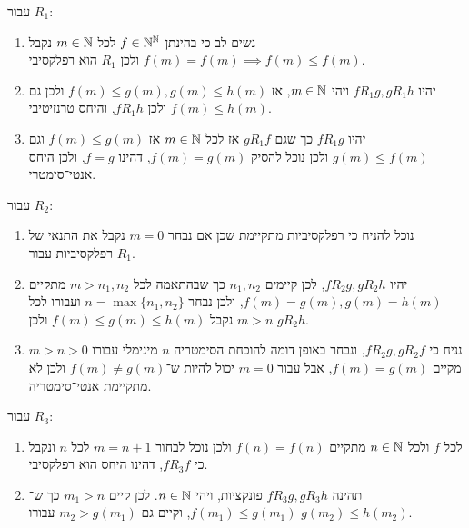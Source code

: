 עבור $R_1$:
\begin{enumerate}
	\item נשים לב כי בהינתן $f \in \mathbb{N}^{\mathbb{N}}$ לכל $m \in \mathbb{N}$ נקבל $f(m) = f(m) \implies f(m) \le f(m)$ ולכן $R_1$ הוא רפלקסיבי.
	\item יהיו $f R_1 g, g R_1 h$ ויהי $m \in \mathbb{N}$, אז $f(m) \le g(m), g(m) \le h(m)$ ולכן גם $f(m) \le h(m)$ ולכן $f R_1 h$, והיחס טרנזיטיבי.
	\item יהיו $f R_1 g$ כך שגם $g R_1 f$ אז לכל $m \in \mathbb{N}$ אז $f(m) \le g(m)$ וגם $g(m) \le f(m)$ ולכן נוכל להסיק $f(m) = g(m)$, דהינו $f = g$, ולכן היחס אנטי־סימטרי.
\end{enumerate}
עבור $R_2$:
\begin{enumerate}
	\item נוכל להניח כי רפלקסיביות מתקיימת שכן אם נבחר $m = 0$ נקבל את התנאי של רפלקסיביות עבור $R_1$.
	\item יהיו $f R_2 g, g R_2 h$, לכן קיימים $n_1, n_2$ כך שבהתאמה לכל $m > n_1, n_2$ מתקיים $f(m) = g(m), g(m) = h(m)$, ולכן נבחר $n = \max\{n_1, n_2\}$ ועבורו לכל $m > n$ נקבל $f(m) \le g(m) \le h(m)$ ולכן $g R_2 h$.
	\item נניח כי $f R_2 g, g R_2 f$, ונבחר באופן דומה להוכחת הסימטריה $n$ מינימלי עבורו $m > n > 0$ מקיים $f(m) = g(m)$, אבל עבור $m = 0$ יכול להיות ש־$f(m) \ne g(m)$ ולכן לא מתקיימת אנטי־סימטריה.
\end{enumerate}
עבור $R_3$:
\begin{enumerate}
	\item לכל $f$ ולכל $n \in \mathbb{N}$ מתקיים $f(n) = f(n)$ ולכן נוכל לבחור $m = n + 1$ לכל $n$ ונקבל כי $f R_3 f$, דהינו היחס הוא רפלקסיבי.
	\item תהינה $f R_3 g, g R_3 h$ פונקציות, ויהי $n \in \mathbb{N}$. לכן קיים $m_1 > n$ כך ש־$f(m_1) \le g(m_1)$, וקיים גם $m_2 > g(m_1)$ עבורו $g(m_2) \le h(m_2)$.
\end{enumerate}


